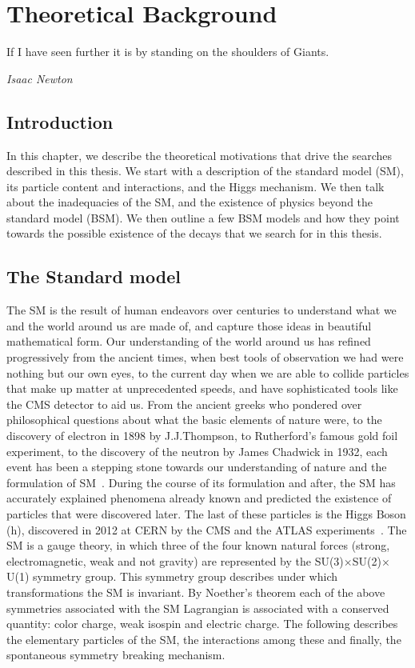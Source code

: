 %
%

\chapter{Theoretical Background}
\label{chap:theory}
\epigraph{If I have seen further it is by standing on the shoulders of Giants.}{\textit{Isaac Newton}}
\section{Introduction}
In this chapter, we describe the theoretical motivations that drive the searches described in this thesis. We start with a description of the standard model (SM), its particle content and interactions, and the Higgs mechanism. We then talk about the inadequacies of the SM, and the existence of physics beyond the standard model (BSM). We then outline a few BSM models and how they point towards the possible existence of the decays that we search for in this thesis.  

\section{The Standard model }
\label{sec:SM}
The SM is the result of human endeavors over centuries to understand what we and the world around us are made of, and capture those ideas in beautiful mathematical form. Our understanding of the world around us has refined progressively from the ancient times, when best tools of observation we had were nothing but our own eyes, to the current day when we are able to collide particles that make up matter at unprecedented speeds, and have sophisticated tools like the CMS detector to aid us. From the ancient greeks who pondered over philosophical questions about what the basic elements of nature were, to the discovery of electron in 1898 by J.J.Thompson, to Rutherford's famous gold foil experiment, to the discovery of the neutron by James Chadwick in 1932, each event has been a stepping stone towards our understanding of nature and the formulation of SM~\cite{th_gun}. During the course of its formulation and after, the SM has accurately explained phenomena already known and predicted the existence of particles that were discovered later. The last of these particles is the Higgs Boson (h), discovered in 2012 at CERN by the CMS and the ATLAS experiments~\cite{Aad:2012tfa, Chatrchyan:2012ufa, Chatrchyan:2013lba}. The SM is a gauge theory, in which three of the four known natural forces (strong, electromagnetic, weak and not gravity) are represented by the SU(3)$\times$SU(2)$\times$U(1) symmetry group. This symmetry group describes under which transformations the SM is invariant. By Noether's theorem each of the above symmetries associated with the SM Lagrangian is associated with a conserved quantity: color charge, weak isospin and electric charge. The following describes the elementary particles of the SM, the interactions among these and finally, the spontaneous symmetry breaking mechanism.

